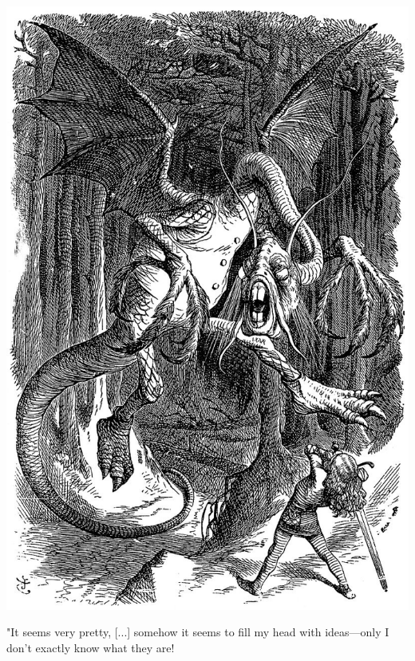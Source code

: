 \documentclass[twoside,openright,frontopenright]{ip3thesis}
\begin{document}
\begin{epigraph*}

\begin{center}
\centering 
\includegraphics[width=1\textwidth]{img/Jabberwocky.jpg}

	"It seems very pretty, [...] somehow it seems to fill my head with ideas—only I don't exactly know what they are!
\end{center}
\end{epigraph*}
\end{document}
